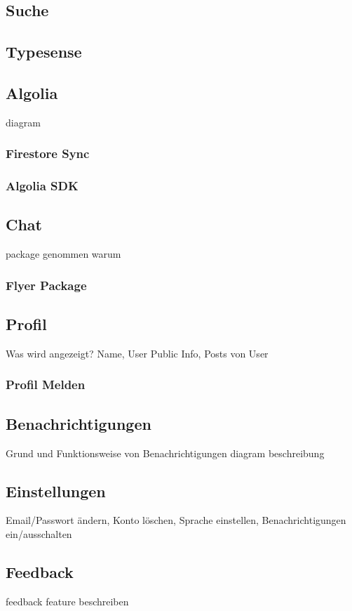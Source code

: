 \subsection{Suche}
\subsection{Typesense}
\subsection{Algolia}
diagram
\subsubsection{Firestore Sync}

\subsubsection{Algolia SDK}


\subsection{Chat}
package genommen warum
\subsubsection{Flyer Package}
\subsection{Profil}
Was wird angezeigt?
Name, User Public Info, Posts von User

\subsubsection{Profil Melden}

\subsection{Benachrichtigungen}
Grund und Funktionsweise von Benachrichtigungen
diagram beschreibung
\subsection{Einstellungen}
Email/Passwort ändern, Konto löschen, Sprache einstellen, Benachrichtigungen ein/ausschalten
\subsection{Feedback}
\author{Martin Hausleitner}
feedback feature beschreiben


